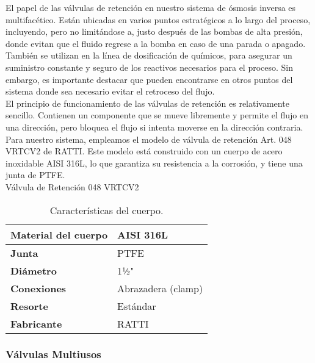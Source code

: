 El papel de las válvulas de retención en nuestro sistema de ósmosis inversa es multifacético. Están ubicadas en varios puntos estratégicos a lo largo del proceso, incluyendo, pero no limitándose a, justo después de las bombas de alta presión, donde evitan que el fluido regrese a la bomba en caso de una parada o apagado. También se utilizan en la línea de dosificación de químicos, para asegurar un suministro constante y seguro de los reactivos necesarios para el proceso. Sin embargo, es importante destacar que pueden encontrarse en otros puntos del sistema donde sea necesario evitar el retroceso del flujo.\\

El principio de funcionamiento de las válvulas de retención es relativamente sencillo. Contienen un componente que se mueve libremente y permite el flujo en una dirección, pero bloquea el flujo si intenta moverse en la dirección contraria.\\

Para nuestro sistema, empleamos el modelo de válvula de retención Art. 048 VRTCV2 de RATTI. Este modelo está construido con un cuerpo de acero inoxidable AISI 316L, lo que garantiza su resistencia a la corrosión, y tiene una junta de PTFE.\\

Válvula de Retención 048 VRTCV2\\

\begin{table}[H]
    \centering
    \caption{Características del cuerpo.}
    \label{table:cuerpo}
    \begin{tabular}{| L{5cm} | L{5cm} |}
        \hline
        \textbf{Material del cuerpo} & AISI 316L \\
        \hline
        \textbf{Junta} & PTFE \\
        \hline
        \textbf{Diámetro} & 1½" \\
        \hline
        \textbf{Conexiones} & Abrazadera (clamp) \\
        \hline
        \textbf{Resorte} & Estándar \\
        \hline
        \textbf{Fabricante} & RATTI \\
        \hline
    \end{tabular}
\end{table}


\subsubsection{Válvulas Multiusos}

